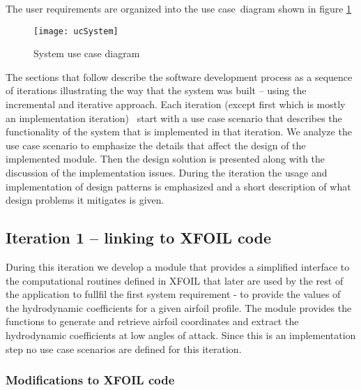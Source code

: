 The user requirements are organized into the use case\ diagram shown in
figure \ref{UseCases}

\begin{figure}[!ht]
\centering
\texttt{[image: ucSystem]}
\caption{System use case diagram}\label{UseCases}
\end{figure}

The sections that follow describe the software development process as a
sequence of iterations illustrating the way that the system was built --
using the incremental and iterative approach. Each iteration (except first
which is mostly an implementation iteration) \ start with a use case
scenario that describes the functionality of the system that is implemented
in that iteration. We analyze the use case scenario to emphasize the details
that affect the design of the implemented module. Then the design solution
is presented along with the discussion of the implementation issues. During
the iteration the usage and implementation of design patterns is emphasized
and a short description of what design problems it mitigates is given.

\subsection{Iteration 1 -- linking to XFOIL code}

During this iteration we develop a module that provides a simplified
interface to the computational routines defined in XFOIL that later are used
by the rest of the application to fullfil the first system requirement - to
provide the values of the hydrodynamic coefficients for a given airfoil
profile. The module provides the functions to generate and retrieve airfoil
coordinates and extract the hydrodynamic coefficients at low angles of
attack. Since this is an implementation step no use case scenarios are
defined for this iteration.

\subsubsection{Modifications to XFOIL code}

